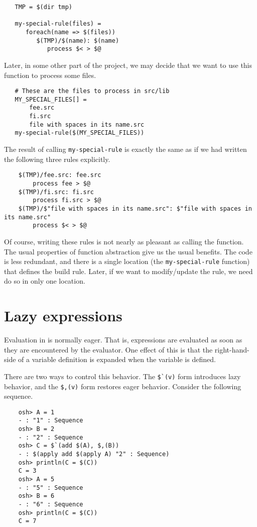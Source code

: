 \begin{verbatim}
   TMP = $(dir tmp)

   my-special-rule(files) =
      foreach(name => $(files))
         $(TMP)/$(name): $(name)
            process $< > $@
\end{verbatim}

Later, in some other part of the project, we may decide that we want to use this function to process some files.

\begin{verbatim}
   # These are the files to process in src/lib
   MY_SPECIAL_FILES[] =
       fee.src
       fi.src
       file with spaces in its name.src
   my-special-rule($(MY_SPECIAL_FILES))
\end{verbatim}

The result of calling \verb+my-special-rule+ is
exactly the same as if we had written the following three rules explicitly.

\begin{verbatim}
    $(TMP)/fee.src: fee.src
        process fee > $@
    $(TMP)/fi.src: fi.src
        process fi.src > $@
    $(TMP)/$"file with spaces in its name.src": $"file with spaces in its name.src"
        process $< > $@
\end{verbatim}

Of course, writing these rules is not nearly as pleasant as calling the function.  The usual
properties of function abstraction give us the usual benefits.  The code is less redundant, and
there is a single location (the \verb+my-special-rule+ function) that defines the build rule.
Later, if we want to modify/update the rule, we need do so in only one location.

\section{Lazy expressions}
\label{section:lazy}

Evaluation in  is normally eager.  That is, expressions
are evaluated as soon as they are encountered by the evaluator.  One effect
of this is that the right-hand-side of a variable definition is expanded
when the variable is defined.

There are two ways to control this behavior.  The \verb+$`(v)+ form
introduces lazy behavior, and the \verb+$,(v)+ form restores
eager behavior.  Consider the following sequence.

\begin{verbatim}
    osh> A = 1
    - : "1" : Sequence
    osh> B = 2
    - : "2" : Sequence
    osh> C = $`(add $(A), $,(B))
    - : $(apply add $(apply A) "2" : Sequence)
    osh> println(C = $(C))
    C = 3
    osh> A = 5
    - : "5" : Sequence
    osh> B = 6
    - : "6" : Sequence
    osh> println(C = $(C))
    C = 7
\end{verbatim}

